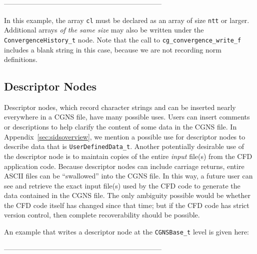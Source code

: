 \documentclass[12pt]{article}
\begin{document}
--------------------------------------------------------------------

\noindent In this example, the array {\tt cl} must be declared as 
an array of size {\tt ntt} or larger.  Additional arrays {\it of the same
size} may also be written under the {\tt ConvergenceHistory\_t}
node.  Note that the call to {\tt cg\_convergence\_write\_f}
includes a blank string in this case, because we are not recording
norm definitions.

\subsection{Descriptor Nodes} \label{sec:descript}

Descriptor nodes, which record character strings and can be
inserted nearly everywhere in a CGNS file, have many 
possible uses.
Users can insert comments or descriptions
to help clarify the content of some data in the CGNS file.  In Appendix~\ref{sec:sidsoverview},
we mention a possible use for descriptor nodes to describe
data that is {\tt UserDefinedData\_t}.
Another potentially desirable use of the descriptor node is
to maintain copies of the entire {\it input} file(s)
from the CFD application code.  Because descriptor nodes
can include carriage returns, entire ASCII files can be 
``swallowed'' into the CGNS file.  In this way, a future user
can see and retrieve the exact input file(s) used by
the CFD code to generate
the data contained in the CGNS file.  The only ambiguity
possible would be whether the CFD code itself has changed since
that time; but if the CFD code has strict version control,
then complete recoverability should be possible.

An example that writes a descriptor node at the {\tt CGNSBase\_t} level
is given here:

--------------------------------------------------------------------
\end{document}

